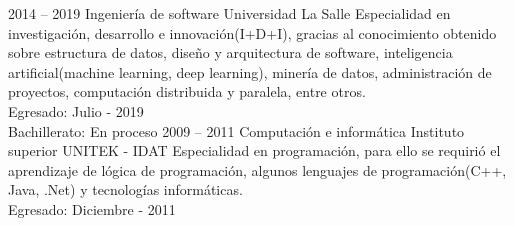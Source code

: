 
\begin{entrylist}
	\entry
		{2014 -- 2019}
		{Ingeniería de software}
		{Universidad La Salle}
		{
		    Especialidad en investigación, desarrollo e innovación(I+D+I), gracias al conocimiento obtenido sobre estructura de datos, diseño y arquitectura de software, inteligencia artificial(machine learning, deep learning), minería de datos, administración de proyectos, computación distribuida y paralela, entre otros.\\
		    
		    Egresado: Julio - 2019 \\
		    Bachillerato: En proceso
		}
	\entry
		{2009 -- 2011}
		{Computación e informática}
		{Instituto superior UNITEK - IDAT}
		{
		    Especialidad en programación, para ello se requirió el aprendizaje de lógica de programación, algunos lenguajes de programación(C++, Java, .Net) y tecnologías informáticas.\\
		    
		    Egresado: Diciembre - 2011
        }
\end{entrylist}

\newpage


